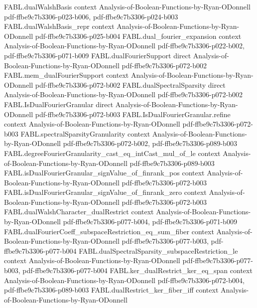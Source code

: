 \begin{theorem}
  {FABL.dualWalshBasis}
  {context}
  {Analysis-of-Boolean-Functions-by-Ryan-ODonnell}
  {pdf-ffbe9c7b3306-p023-b006,
    pdf-ffbe9c7b3306-p024-b003}
\proofstep
  {FABL.dualWalshBasis_repr}
  {context}
  {Analysis-of-Boolean-Functions-by-Ryan-ODonnell}
  {pdf-ffbe9c7b3306-p025-b004}
\proofstep
  {FABL.dual_fourier_expansion}
  {context}
  {Analysis-of-Boolean-Functions-by-Ryan-ODonnell}
  {pdf-ffbe9c7b3306-p022-b002,
    pdf-ffbe9c7b3306-p071-b009}
\proofstep
  {FABL.dualFourierSupport}
  {direct}
  {Analysis-of-Boolean-Functions-by-Ryan-ODonnell}
  {pdf-ffbe9c7b3306-p072-b002}
\proofstep
  {FABL.mem_dualFourierSupport}
  {context}
  {Analysis-of-Boolean-Functions-by-Ryan-ODonnell}
  {pdf-ffbe9c7b3306-p072-b002}
\proofstep
  {FABL.dualSpectralSparsity}
  {direct}
  {Analysis-of-Boolean-Functions-by-Ryan-ODonnell}
  {pdf-ffbe9c7b3306-p072-b002}
\proofstep
  {FABL.IsDualFourierGranular}
  {direct}
  {Analysis-of-Boolean-Functions-by-Ryan-ODonnell}
  {pdf-ffbe9c7b3306-p072-b003}
\proofstep
  {FABL.IsDualFourierGranular.refine}
  {context}
  {Analysis-of-Boolean-Functions-by-Ryan-ODonnell}
  {pdf-ffbe9c7b3306-p072-b003}
\proofstep
  {FABL.spectralSparsityGranularity}
  {context}
  {Analysis-of-Boolean-Functions-by-Ryan-ODonnell}
  {pdf-ffbe9c7b3306-p072-b002,
    pdf-ffbe9c7b3306-p089-b003}
\proofstep
  {FABL.degreeFourierGranularity_cast_eq_intCast_mul_of_le}
  {context}
  {Analysis-of-Boolean-Functions-by-Ryan-ODonnell}
  {pdf-ffbe9c7b3306-p089-b003}
\proofstep
  {FABL.isDualFourierGranular_signValue_of_finrank_pos}
  {context}
  {Analysis-of-Boolean-Functions-by-Ryan-ODonnell}
  {pdf-ffbe9c7b3306-p072-b003}
\proofstep
  {FABL.isDualFourierGranular_signValue_of_finrank_zero}
  {context}
  {Analysis-of-Boolean-Functions-by-Ryan-ODonnell}
  {pdf-ffbe9c7b3306-p072-b003}
\proofstep
  {FABL.dualWalshCharacter_dualRestrict}
  {context}
  {Analysis-of-Boolean-Functions-by-Ryan-ODonnell}
  {pdf-ffbe9c7b3306-p077-b004,
    pdf-ffbe9c7b3306-p071-b009}
\proofstep
  {FABL.dualFourierCoeff_subspaceRestriction_eq_sum_fiber}
  {context}
  {Analysis-of-Boolean-Functions-by-Ryan-ODonnell}
  {pdf-ffbe9c7b3306-p077-b003,
    pdf-ffbe9c7b3306-p077-b004}
\proofstep
  {FABL.dualSpectralSparsity_subspaceRestriction_le}
  {context}
  {Analysis-of-Boolean-Functions-by-Ryan-ODonnell}
  {pdf-ffbe9c7b3306-p077-b003,
    pdf-ffbe9c7b3306-p077-b004}
\proofstep
  {FABL.ker_dualRestrict_ker_eq_span}
  {context}
  {Analysis-of-Boolean-Functions-by-Ryan-ODonnell}
  {pdf-ffbe9c7b3306-p072-b004,
    pdf-ffbe9c7b3306-p089-b003}
\proofstep
  {FABL.dualRestrict_ker_fiber_iff}
  {context}
  {Analysis-of-Boolean-Functions-by-Ryan-ODonnell}

\end{theorem}
